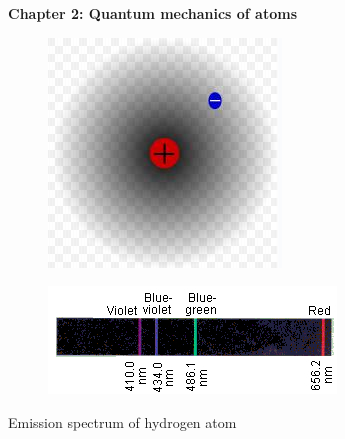 \renewcommand{\theequation}{2.\arabic{equation}}

\begin{frame}
\begin{center}
{\bf Chapter 2: Quantum mechanics of atoms}\\
\end{center}

\begin{figure}
\centering
\includegraphics[scale=0.3]{figs/intro1}
\end{figure}

\begin{figure}
\centering
\includegraphics[scale=0.40]{figs/intro2}
\end{figure}

\begin{center}
{\footnotesize Emission spectrum of hydrogen atom}
\end{center}
\end{frame}

\scriptsize















